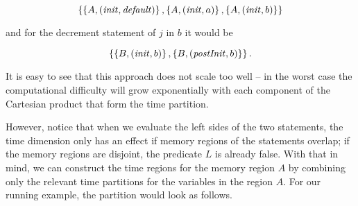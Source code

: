 \documentclass[..thesis.tex]{subfiles}
\begin{document}
\begin{equation*}
\left\lbrace \left\lbrace A, \left( \mathit{init}, \mathit{default} \right) \right\rbrace, \left\lbrace A, \left( \mathit{init}, a  \right) \right\rbrace, \left\lbrace A, \left( \mathit{init}, b \right) \right\rbrace \right\rbrace
\end{equation*}

and for the decrement statement of $j$ in $b$ it would be

\begin{equation*}
\left\lbrace \left\lbrace B, \left( \mathit{init}, b \right)  \right\rbrace, \left\lbrace B, \left( \mathit{postInit}, b \right) \right\rbrace \right\rbrace \text{.}
\end{equation*}


It is easy to see that this approach does not scale too well -- in the worst case the computational difficulty will grow exponentially
with each component of the Cartesian product that form the time partition.

However, notice that when we evaluate the left sides of the two statements, the
time dimension only has an effect if memory regions of the statements overlap;
if the memory regions are disjoint, the predicate $L$ is already false.
%
%
%
With that in mind, we can construct the time regions for the memory region $A$ by combining only the relevant time partitions for the variables in the region $A$. 
For our running example, the partition would look as follows.
\end{document}
